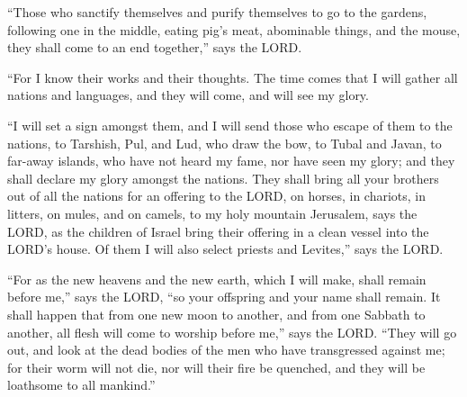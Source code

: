  ``Those who sanctify themselves and purify themselves to
go to the gardens, following one in the middle, eating pig's meat,
abominable things, and the mouse, they shall come to an end together,''
says the LORD.

 ``For I know their works and their thoughts. The time
comes that I will gather all nations and languages, and they will come,
and will see my glory.

 ``I will set a sign amongst them, and I will send those
who escape of them to the nations, to Tarshish, Pul, and Lud, who draw
the bow, to Tubal and Javan, to far-away islands, who have not heard my
fame, nor have seen my glory; and they shall declare my glory amongst
the nations.  They shall bring all your brothers out of all
the nations for an offering to the LORD, on horses, in chariots, in
litters, on mules, and on camels, to my holy mountain Jerusalem, says
the LORD, as the children of Israel bring their offering in a clean
vessel into the LORD's house.  Of them I will also select
priests and Levites,'' says the LORD.

 ``For as the new heavens and the new earth, which I will
make, shall remain before me,'' says the LORD, ``so your offspring and
your name shall remain.  It shall happen that from one new
moon to another, and from one Sabbath to another, all flesh will come to
worship before me,'' says the LORD.  ``They will go out,
and look at the dead bodies of the men who have transgressed against me;
for their worm will not die, nor will their fire be quenched, and they
will be loathsome to all mankind.''
